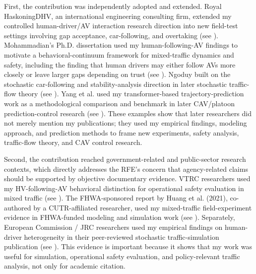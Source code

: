 \documentclass[11pt,letterpaper]{article}
\begin{document}
First, the contribution was independently adopted and extended. Royal HaskoningDHV, an international engineering consulting firm, extended my controlled human-driver/AV interaction research direction into new field-test settings involving gap acceptance, car-following, and overtaking (see ). Mohammadian's Ph.D. dissertation used my human-following-AV findings to motivate a behavioral-continuum framework for mixed-traffic dynamics and safety, including the finding that human drivers may either follow AVs more closely or leave larger gaps depending on trust (see ). Ngoduy built on the stochastic car-following and stability-analysis direction in later stochastic traffic-flow theory (see ). Yang et al. used my transformer-based trajectory-prediction work as a methodological comparison and benchmark in later CAV/platoon prediction-control research (see ). These examples show that later researchers did not merely mention my publications; they used my empirical findings, modeling approach, and prediction methods to frame new experiments, safety analysis, traffic-flow theory, and CAV control research.

Second, the contribution reached government-related and public-sector research contexts, which directly addresses the RFE's concern that agency-related claims should be supported by objective documentary evidence. VTRC researchers used my HV-following-AV behavioral distinction for operational safety evaluation in mixed traffic (see ). The FHWA-sponsored report by Huang et al. (2021), co-authored by a CUTR-affiliated researcher, used my mixed-traffic field-experiment evidence in FHWA-funded modeling and simulation work (see ). Separately, European Commission / JRC researchers used my empirical findings on human-driver heterogeneity in their peer-reviewed stochastic traffic-simulation publication (see ). This evidence is important because it shows that my work was useful for simulation, operational safety evaluation, and policy-relevant traffic analysis, not only for academic citation.
\end{document}
